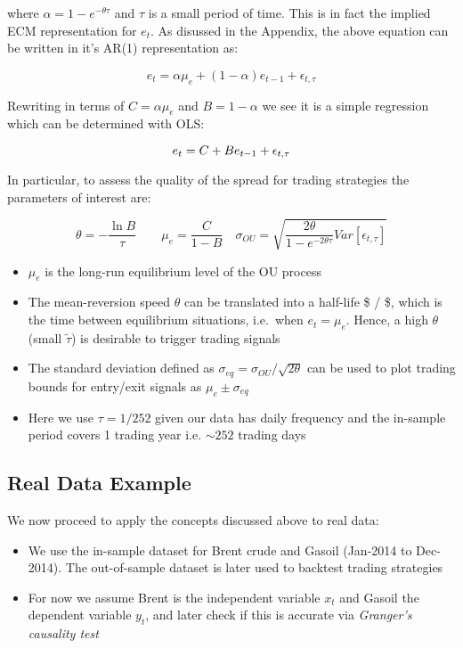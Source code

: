 \documentclass{article}
\begin{document}
where \(\alpha= 1 - e^{-\theta \tau}\) and \(\tau\) is a small period of
time. This is in fact the implied ECM representation for \(e_t\). As
disussed in the Appendix, the above equation can be written in it's
AR(1) representation as:

\[
e_t = \alpha \mu_e + (1-\alpha)e_{t-1} + \epsilon_{t, \tau}
\]

Rewriting in terms of \(C = \alpha \mu_e\) and \(B=1-\alpha\) we see it
is a simple regression which can be determined with OLS:

\[ 
\begin{equation}
e_t = C + B e_{t-1} + \epsilon_{t, \tau} \\
\end{equation}
\]

In particular, to assess the quality of the spread for trading
strategies the parameters of interest are:

\[
\theta = -\frac{\ln B}{\tau} \qquad \mu_e = \frac{C}{1-B} 
\quad \sigma_{OU} = \sqrt{\frac{2 \theta}{1-e^{-2\theta \tau}} Var[\epsilon_{t, \tau}]}
\]

\begin{itemize}
\item
  \(\mu_e\) is the long-run equilibrium level of the OU process
\item
  The mean-reversion speed \(\theta\) can be translated into a half-life
  \$\tilde{\tau} \propto {} / \theta \$, which is the time between
  equilibrium situations, i.e.~when \(e_t = \mu_e\). Hence, a high
  \(\theta\) (small \(\tilde{\tau}\)) is desirable to trigger trading
  signals
\item
  The standard deviation defined as
  \(\sigma_{eq} = \sigma_{OU} / \sqrt{2 \theta}\) can be used to plot
  trading bounds for entry/exit signals as \(\mu_e \pm \sigma_{eq}\)
\item
  Here we use \(\tau = 1/252\) given our data has daily frequency and
  the in-sample period covers 1 trading year i.e. \(\sim 252\) trading
  days
\end{itemize}

    \subsection{Real Data Example}\label{real-data-example}

    We now proceed to apply the concepts discussed above to real data:

\begin{itemize}
\item
  We use the in-sample dataset for Brent crude and Gasoil (Jan-2014 to
  Dec-2014). The out-of-sample dataset is later used to backtest trading
  strategies
\item
  For now we assume Brent is the independent variable \(x_t\) and Gasoil
  the dependent variable \(y_t\), and later check if this is accurate
  via \emph{Granger's causality test}
\end{itemize}
\end{document}
